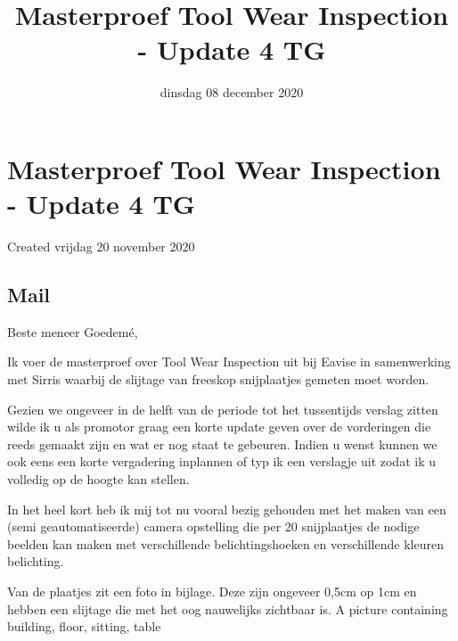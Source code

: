 \documentclass{scrartcl}
\title{Masterproef Tool Wear Inspection - Update 4 TG}
\date{dinsdag 08 december 2020}
\author{}
\begin{document}
\maketitle

		\section{Masterproef Tool Wear Inspection - Update 4 TG}

Created vrijdag 20 november 2020



\subsection{Mail}

Beste meneer Goedemé,

 

Ik voer de masterproef over Tool Wear Inspection uit bij Eavise in samenwerking met Sirris waarbij de slijtage van freeskop snijplaatjes gemeten moet worden.

Gezien we ongeveer in de helft van de periode tot het tussentijds verslag zitten wilde ik u als promotor graag een korte update geven over de vorderingen die reeds gemaakt zijn en wat er nog staat te gebeuren. Indien u wenst kunnen we ook eens een korte vergadering inplannen of typ ik een verslagje uit zodat ik u volledig op de hoogte kan stellen.

 

In het heel kort heb ik mij tot nu vooral bezig gehouden met het maken van een (semi geautomatiseerde) camera opstelling die per 20 snijplaatjes de nodige beelden kan maken met verschillende belichtingshoeken en verschillende kleuren belichting.

Van de plaatjes zit een foto in bijlage. Deze zijn ongeveer 0,5cm op 1cm en hebben een slijtage die met het oog nauwelijks zichtbaar is. A picture containing building, floor, sitting, table
\end{document}
